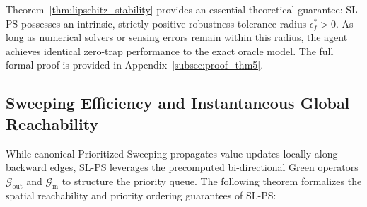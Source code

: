 \documentclass[11pt,a4paper]{article}
\begin{document}
Theorem~\ref{thm:lipschitz_stability} provides an essential theoretical guarantee: SL-PS possesses an intrinsic, strictly positive robustness tolerance radius $\epsilon_f^* > 0$. As long as numerical solvers or sensing errors remain within this radius, the agent achieves identical zero-trap performance to the exact oracle model. The full formal proof is provided in Appendix~\ref{subsec:proof_thm5}.

\subsection{Sweeping Efficiency and Instantaneous Global Reachability}
\label{subsec:sweeping_efficiency}

While canonical Prioritized Sweeping propagates value updates locally along backward edges, SL-PS leverages the precomputed bi-directional Green operators $\mathcal{G}_{\text{out}}$ and $\mathcal{G}_{\text{in}}$ to structure the priority queue. The following theorem formalizes the spatial reachability and priority ordering guarantees of SL-PS:
\end{document}

